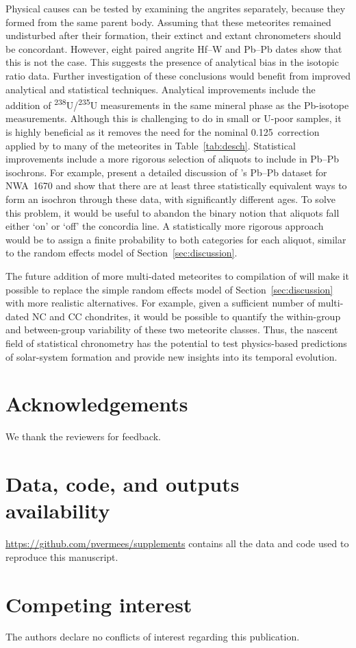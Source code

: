 Physical causes can be tested by examining the angrites separately,
because they formed from the same parent body. Assuming that these
meteorites remained undisturbed after their formation, their extinct
and extant chronometers should be concordant. However, eight paired
angrite Hf--W and Pb--Pb dates show that this is not the case.  This
suggests the presence of analytical bias in the isotopic ratio data.
Further investigation of these conclusions would benefit from improved
analytical and statistical techniques.  Analytical improvements
include the addition of \textsuperscript{238}U/\textsuperscript{235}U
measurements in the same mineral phase as the Pb-isotope
measurements. Although this is challenging to do in small or U-poor
samples, it is highly beneficial as it removes the need for the
nominal 0.125\textperthousand\ correction applied by
\citet{desch2023a,desch2023b} to many of the meteorites in
Table~\ref{tab:desch}.  Statistical improvements include a more
rigorous selection of aliquots to include in Pb--Pb isochrons.  For
example, \citet{desch2023a} present a detailed discussion of
\citet{schiller2015}'s Pb--Pb dataset for NWA~1670 and show that there
are at least three statistically equivalent ways to form an isochron
through these data, with significantly different ages. To solve this
problem, it would be useful to abandon the binary notion that aliquots
fall either `on' or `off' the concordia line. A statistically more
rigorous approach would be to assign a finite probability to both
categories for each aliquot, similar to the random effects model of
Section~\ref{sec:discussion}.\medskip

The future addition of more multi-dated meteorites to compilation of 
\citet{desch2023b} will make it possible to replace the
simple random effects model of Section~\ref{sec:discussion} with more
realistic alternatives. For example, given a sufficient number of
multi-dated NC and CC chondrites, it would be possible to quantify the
within-group and between-group variability of these two meteorite
classes.  Thus, the nascent field of statistical chronometry has the
potential to test physics-based predictions of solar-system formation
and provide new insights into its temporal evolution.

\section{Acknowledgements} %

We thank the reviewers for feedback.

\section{Data, code, and outputs availability}

\url{https://github.com/pvermees/supplements} contains all the data
and code used to reproduce this manuscript.

\section{Competing interest}

The authors declare no conflicts of interest regarding this
publication.
